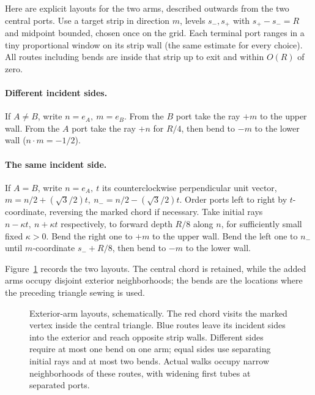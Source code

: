 Here are explicit layouts for the two arms, described outwards from the two central ports. Use a target strip in direction \(m\), levels \(s_-,s_+\) with \(s_+-s_-=R\) and midpoint bounded, chosen once on the grid. Each terminal port ranges in a tiny proportional window on its strip wall (the same estimate for every choice). All routes including bends are inside that strip up to exit and within \(O(R)\) of zero.
\paragraph{Different incident sides.} If \(A\ne B\), write \(n=e_A,\ m=e_B\). From the \(B\) port take the ray \(+m\) to the upper wall. From the \(A\) port take the ray \(+n\) for \(R/4\), then bend to \(-m\) to the lower wall (\(n\cdot m=-1/2\)).
\paragraph{The same incident side.} If \(A=B\), write \(n=e_A,\ t\) its counterclockwise perpendicular unit vector, \(m=n/2+(\sqrt3/2)t,\ n_-=n/2-(\sqrt3/2)t\). Order ports left to right by \(t\)-coordinate, reversing the marked chord if necessary. Take initial rays \(n-\kappa t,\ n+\kappa t\) respectively, to forward depth \(R/8\) along \(n\), for sufficiently small fixed \(\kappa>0\). Bend the right one to \(+m\) to the upper wall. Bend the left one to \(n_-\) until \(m\)-coordinate \(s_-+R/8\), then bend to \(-m\) to the lower wall.

Figure~\ref{fig:exterior-arms} records the two layouts.  The central chord
is retained, while the added arms occupy disjoint exterior neighborhoods;
the bends are the locations where the preceding triangle sewing is used.
\begin{figure}[htbp]
\centering

\caption{Exterior-arm layouts, schematically.  The red chord visits the
marked vertex inside the central triangle.  Blue routes leave its incident
sides into the exterior and reach opposite strip walls.  Different sides
require at most one bend on one arm; equal sides use separating initial
rays and at most two bends.  Actual walks occupy narrow neighborhoods of
these routes, with widening first tubes at separated ports.}
\label{fig:exterior-arms}
\end{figure}

